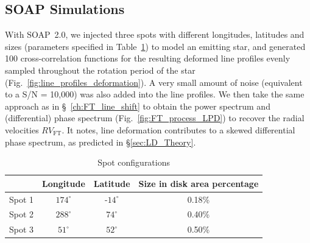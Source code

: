 \subsection{SOAP Simulations}
\label{sec:Simulations}


With SOAP~2.0, we injected three spots with different longitudes, latitudes and sizes (parameters specified in Table~\ref{table:spot_configurations}) to model an emitting star, and generated 100 cross-correlation functions for the resulting  deformed line profiles evenly sampled throughout the rotation period of the star (Fig.~\ref{fig:line_profiles_deformation}). A very small amount of noise (equivalent to a S/N = 10,000) was also added into the line profiles. We then take the same approach as in  \S~\ref{ch:FT_line_shift} to obtain the power spectrum and (differential) phase spectrum (Fig.~\ref{fig:FT_process_LPD}) to recover the radial velocities $RV_\text{FT}$. It notes, line deformation contributes to a skewed differential phase spectrum, as predicted in \S\ref{sec:LD_Theory}. 

\begin{table}[htbp]
\centering
\begin{tabular}{|c|c|c|c|}
\hline 
 & Longitude & Latitude & Size in disk area percentage\\ 
\hline 
Spot 1 & $174^\circ$ & -$14^\circ$ & 0.18\% \\ 
\hline 
Spot 2 & $288^\circ$ & $74^\circ$  & 0.40\% \\ 
\hline 
Spot 3 & $51^\circ$  & $52^\circ$  & 0.50\% \\ 
\hline 
\end{tabular} 
\caption{Spot configurations}
\label{table:spot_configurations}
\end{table}

